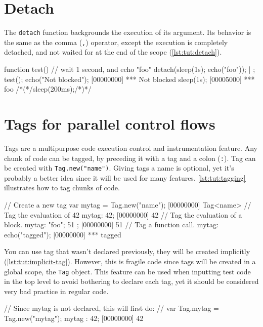 \section{Detach}

The \lstinline{detach} function backgrounds the execution of its
argument. Its behavior is the same as the comma (\lstinline{,}) operator,
except the execution is completely detached, and not waited for at the
end of the scope (\autoref{lst:tut:detach}).

\begin{urbiscript}[caption=Detach, label=lst:tut:detach]
function test()
{
  // wait 1 second, and echo "foo"
  detach({sleep(1s); echo("foo")});
} | {};
test();
echo("Not blocked");
[00000000] *** Not blocked
sleep(1s);
[00005000] *** foo
/*(*/sleep(200ms);/*)*/
\end{urbiscript}

\section{Tags for parallel control flows}
\label{sec:tut:tags}

Tags are a multipurpose code execution control and instrumentation
feature. Any chunk of code can be tagged, by preceding it with a tag
and a colon (\lstinline{:}). Tag can be created with
\lstinline|Tag.new("name")|. Giving tags a name is optional, yet it's
probably a better idea since it will be used for many
features. \autoref{lst:tut:tagging} illustrates how to tag chunks of code.

\begin{urbiscript}[caption=Tagging a block of code, label=lst:tut:tagging]
// Create a new tag
var mytag = Tag.new("name");
[00000000] Tag<name>
// Tag the evaluation of 42
mytag: 42;
[00000000] 42
// Tag the evaluation of a block.
mytag: { "foo"; 51 };
[00000000] 51
// Tag a function call.
mytag: echo("tagged");
[00000000] *** tagged
\end{urbiscript}

You can use tag that wasn't declared previously, they will be created
implicitly (\autoref{lst:tut:implicit-tag}). However, this is fragile code since
tags will be created in a global scope, the \lstinline{Tag} object. This
feature can be used when inputting test code in the top level to avoid
bothering to declare each tag, yet it should be considered very bad
practice in regular code.

\begin{urbiscript}[caption=Tag created implicitly,
label=lst:tut:implicit-tag]
// Since mytag is not declared, this will first do:
// var Tag.mytag = Tag.new("mytag");
mytag : 42;
[00000000] 42
\end{urbiscript}

